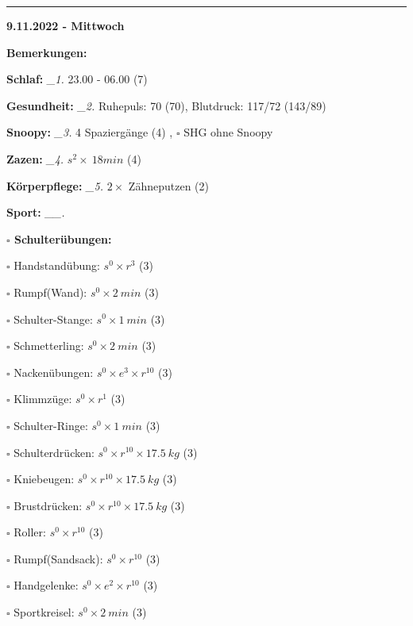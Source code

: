 \documentclass[10pt,a4paper]{article}
\newcommand\prop[1] {{\color {alizarin} {\bf #1}}}             %
\newcommand\rele[1] {{\color {english} \bf {#1}}}              %
\newcommand\mand[1] {{\color {burntorange} {\bf #1}}}          %
\newcommand\ddivide {\vskip -9pt \hrule \vskip 6pt}
\newcommand\topspace{\vskip -15pt \hskip 20pt}
\newcommand\n[1] { {\sl #1.} \hskip 5pt }
\begin{document}
\ddivide
{\rele {9.11.2022 - Mittwoch}}

\begin{mdframed}[style=daystyle]
  \begin{labeling}{{\mand {Bemerkungen:}}}
    \setlength\itemsep{-3pt}
  \item[{\mand {Schlaf:}}]        \n{\_1} 23.00 - 06.00 (7)
  \item[{\mand {Gesundheit:}}]    \n{\_2} Ruhepuls: 70 (70), Blutdruck: 117/72 (143/89)
  \item[{\mand {Snoopy:}}]        \n{\_3} 4 Spaziergänge (4)  , $\square$ SHG ohne Snoopy  
  \item[{\mand {Zazen:}}]         \n{\_4} $s^2 \times\ 18 min$ (4)
  \item[{\mand {Körperpflege:}}]  \n{\_5} $2 \times$ Zähneputzen (2)
  \item[{\mand {Sport:}}]        \n{\_\_}
    \topspace
    \begin{minipage}{0.75\textwidth}  
      \begin{labeling}{\prop {$\square$ {Schulterübungen:}}} 
        \setlength\itemsep{-3pt}
      \item[$\square$ Handstandübung:]  $s^0 \times r^{3}$ (3)
      \item[$\square$ Rumpf(Wand):]     $s^0 \times 2\ min$ (3)
      \item[$\square$ Schulter-Stange:] $s^0 \times 1\ min$ (3)
      \item[$\square$ Schmetterling:]   $s^0 \times 2\ min$ (3)
      \item[$\square$ Nackenübungen:]   $s^0 \times e^3 \times r^{10}$ (3)
      \item[$\square$ Klimmzüge:]       $s^0 \times r^1$ (3)
      \item[$\square$ Schulter-Ringe:]  $s^0 \times 1\ min$ (3)
      \item[$\square$ Schulterdrücken:] $s^0 \times r^{10} \times 17.5\ kg$ (3)
      \item[$\square$ Kniebeugen:]      $s^0 \times r^{10} \times 17.5\ kg$ (3)
      \item[$\square$ Brustdrücken:]    $s^0 \times r^{10} \times 17.5\ kg$ (3)
      \item[$\square$ Roller:]          $s^0 \times r^{10}$ (3)
      \item[$\square$ Rumpf(Sandsack):] $s^0 \times r^{10}$ (3)
      \item[$\square$ Handgelenke:]     $s^0 \times e^2 \times r^{10}$ (3)
      \item[$\square$ Sportkreisel:]    $s^0 \times 2\ min$ (3)

\end{labeling}
\end{minipage}
\end{labeling}
\end{mdframed}
\end{document}
